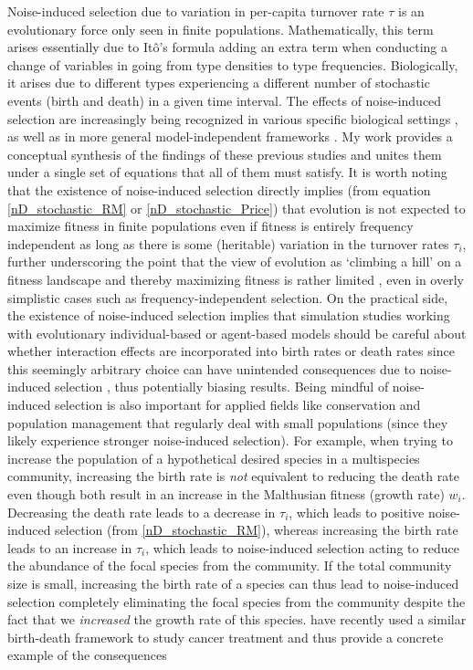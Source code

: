 Noise-induced selection due to variation in per-capita turnover rate $\tau$ is an evolutionary force only seen in finite populations. Mathematically, this term arises essentially due to It\^o's formula adding an extra term when conducting a change of variables in going from type densities to type frequencies. Biologically, it arises due to different types experiencing a different number of stochastic events (birth and death) in a given time interval. The effects of noise-induced selection are increasingly being recognized in various specific biological settings \citep{houchmandzadeh_selection_2012, houchmandzadeh_fluctuation_2015, parsons_pathogen_2018,raatz_promoting_2023},  as well as in more general model-independent frameworks \citep{parsons_consequences_2010,constable_demographic_2016, week_white_2021,mazzolini_universality_2022,kuosmanen_turnover_2022}. My work provides a conceptual synthesis of the findings of these previous studies and unites them under a single set of equations that all of them must satisfy. It is worth noting that the existence of noise-induced selection directly implies (from equation \eqref{nD_stochastic_RM} or \eqref{nD_stochastic_Price}) that evolution is not expected to maximize fitness in finite populations even if fitness is entirely frequency independent as long as there is some (heritable) variation in the turnover rates $\tau_i$, further underscoring the point that the view of evolution as `climbing a hill' on a fitness landscape and thereby maximizing fitness is rather limited \citep{grodwohl_theory_2017}, even in overly simplistic cases such as frequency-independent selection. On the practical side, the existence of noise-induced selection implies that simulation studies working with evolutionary individual-based or agent-based models should be careful about whether interaction effects are incorporated into birth rates or death rates since this seemingly arbitrary choice can have unintended consequences due to noise-induced selection \citep{mcleod_social_2019,kuosmanen_turnover_2022}, thus potentially biasing results. Being mindful of noise-induced selection is also important for applied fields like conservation and population management that regularly deal with small populations (since they likely experience stronger noise-induced selection). For example, when trying to increase the population of a hypothetical desired species in a multispecies community, increasing the birth rate is \emph{not} equivalent to reducing the death rate even though both result in an increase in the Malthusian fitness (growth rate) $w_i$. Decreasing the death rate leads to a decrease in $\tau_i$, which leads to positive noise-induced selection (from \eqref{nD_stochastic_RM}), whereas increasing the birth rate leads to an increase in $\tau_i$, which leads to noise-induced selection acting to reduce the abundance of the focal species from the community. If the total community size is small, increasing the birth rate of a species can thus lead to noise-induced selection completely eliminating the focal species from the community despite the fact that we \emph{increased} the growth rate of this species. \cite{raatz_promoting_2023} have recently used a similar birth-death framework to study cancer treatment and thus provide a concrete example of the consequences 